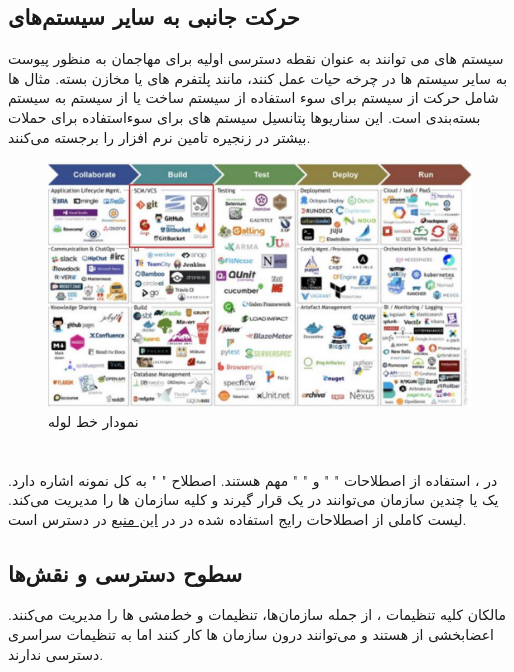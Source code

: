 \documentclass{CSICC}
\begin{document}
   \subsection{حرکت جانبی به سایر سیستم‌های
   	 }

سیستم ‌های
  می ‌توانند به عنوان نقطه دسترسی اولیه برای مهاجمان به منظور پیوست به سایر سیستم‌ ها در چرخه حیات
   عمل کنند، مانند پلتفرم‌ های
    یا مخازن بسته. مثال ‌ها شامل حرکت از سیستم
      برای سوء استفاده از سیستم ساخت
        یا از سیستم
          به سیستم بسته‌بندی
            است. این سناریوها پتانسیل سیستم‌ های
              برای سوءاستفاده برای حملات بیشتر در زنجیره تامین نرم‌ افزار را برجسته می‌کنند.
\begin{figure}[t]
	\includegraphics[width=.9\linewidth]{Images/Devops Pipeline Diagram}
	\caption{نمودار خط لوله 
	}
	\label{fig:DevOps_Pipeline_Diagram}
\end{figure}


\section{
	}
	در
	 ، استفاده از اصطلاحات "
	" و "
	 " مهم هستند. اصطلاح "
	 " به کل نمونه 
	 اشاره دارد. یک یا چندین سازمان می‌توانند در یک 
	 قرار گیرند و 
	 کلیه سازمان ‌ها را مدیریت می‌کند. لیست کاملی از اصطلاحات رایج استفاده شده در 
	 در
	  \href{ https://docs.github.com/en/enterprise-server@3.3/get-started/quickstart/github-glossary}{این منبع}
	   در دسترس است.
\subsection{سطوح دسترسی و نقش‌ها}
مالکان
 کلیه تنظیمات
  ، از جمله سازمان‌ها، تنظیمات و خط‌مشی ‌ها را مدیریت می‌کنند.
اعضابخشی از
  هستند و می‌توانند درون سازمان‌ ها کار کنند اما به تنظیمات سراسری
   دسترسی ندارند.
\end{document}
